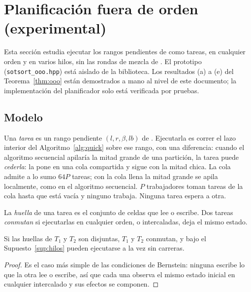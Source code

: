 \section{Planificación fuera de orden (experimental)}\label{sec:ooo}

Esta sección estudia ejecutar los rangos pendientes de \Quick como tareas, en cualquier
orden y en varios hilos, sin las rondas de mezcla de \Paralelo. El prototipo
(\texttt{sotsort\_ooo.hpp}) está aislado de la biblioteca. Los resultados (a) a (e) del
Teorema~\ref{thm:ooo} están demostrados a mano al nivel de este documento; la
implementación del planificador solo está verificada por pruebas.

\subsection{Modelo}
Una \emph{tarea} es un rango pendiente $(l,r,\beta,\mathit{lb})$ de \Quick. Ejecutarla
es correr el lazo interior del Algoritmo~\ref{alg:quick} sobre ese rango, con una
diferencia: cuando el algoritmo secuencial apilaría la mitad grande de una partición,
la tarea puede \emph{cederla}: la pone en una cola compartida y sigue con la mitad
chica. La cola admite a lo sumo $64P$ tareas; con la cola llena la mitad grande se
apila localmente, como en el algoritmo secuencial. $P$ trabajadores toman tareas de la
cola hasta que está vacía y ninguno trabaja. Ninguna tarea espera a otra.

La \emph{huella} de una tarea es el conjunto de celdas que lee o escribe. Dos tareas
\emph{conmutan} si ejecutarlas en cualquier orden, o intercaladas, deja el mismo estado.

\begin{lema}[Conmutación]\label{lem:conm}
Si las huellas de $T_1$ y $T_2$ son disjuntas, $T_1$ y $T_2$ conmutan, y bajo el
Supuesto~\ref{sup:hilos} pueden ejecutarse a la vez sin carreras.
\end{lema}
\begin{proof}
Es el caso más simple de las condiciones de Bernstein: ninguna escribe lo que la otra
lee o escribe, así que cada una observa el mismo estado inicial en cualquier
intercalado y sus efectos se componen.
\end{proof}

